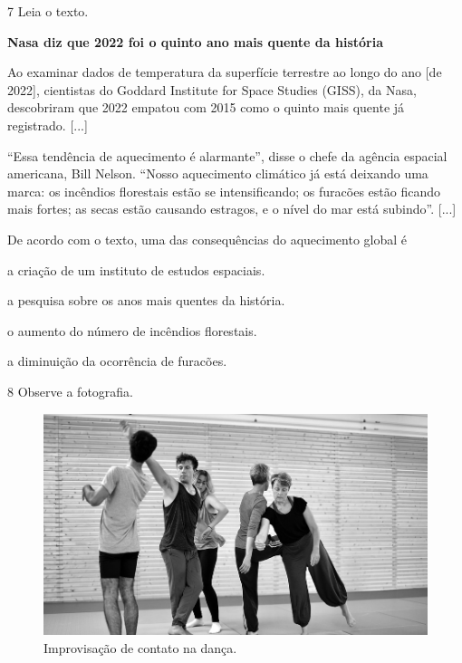 \num{7} Leia o texto.

\begin{myquote}
\textbf{Nasa diz que 2022 foi o quinto ano mais quente da história}


Ao examinar dados de temperatura da superfície terrestre ao longo do ano
[de 2022], cientistas do Goddard Institute for Space Studies (GISS), da
Nasa, descobriram que 2022 empatou com 2015 como o quinto mais quente já
registrado.
{[}...{]}

“Essa tendência de aquecimento é alarmante”, disse o chefe da agência
espacial americana, Bill Nelson. “Nosso aquecimento climático já está
deixando uma marca: os incêndios florestais estão se intensificando; os
furacões estão ficando mais fortes; as secas estão causando estragos, e
o nível do mar está subindo”.
{[}...{]}

\end{myquote}

De acordo com o texto, uma das consequências do aquecimento global é

\begin{escolha}
\item a criação de um instituto de estudos espaciais.

\item a pesquisa sobre os anos mais quentes da história.

\item o aumento do número de incêndios florestais.

\item a diminuição da ocorrência de furacões.
\end{escolha}


\num{8}  Observe a fotografia.

\begin{figure}[htpb!]
\includegraphics[width=\textwidth]{./imgs/art39.png}
\caption{Improvisação de contato na dança.}
\end{figure}

